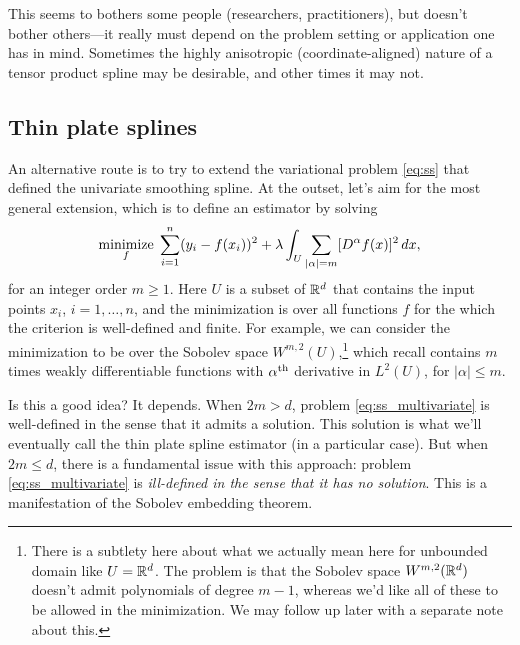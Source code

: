 \documentclass{article}
\begin{document}
This seems to bothers some people (researchers, practitioners), but doesn't
bother others---it really must depend on the problem setting or application one
has in mind. Sometimes the highly anisotropic (coordinate-aligned) nature of a
tensor product spline may be desirable, and other times it may not.    

\subsection{Thin plate splines}

An alternative route is to try to extend the variational problem \eqref{eq:ss}
that defined the univariate smoothing spline. At the outset, let's aim for the
most general extension, which is to define an estimator by solving
\begin{equation}
\label{eq:ss_multivariate}
\mathop{\mathrm{minimize}}_f \; \sum_{i=1}^n (y_i - f(x_i))^2 + \lambda \int_U \sum_{|\alpha| =
  m} [D^\alpha f(x)]^2 \, dx,   
\end{equation}
for an integer order $m \geq 1$. Here $U$ is a subset of $\mathbb{R}^d$ that contains
the input points $x_i$, $i=1,\dots,n$, and the minimization is over all
functions $f$ for the which the criterion is well-defined and finite. For
example, we can consider the minimization to be over the Sobolev space
$W^{m,2}(U)$,\footnote{There is a subtlety here about what we actually mean here
  for unbounded domain like $U = \mathbb{R}^d$. The problem is that the Sobolev space 
  $W^{m,2}(\mathbb{R}^d)$ doesn't admit polynomials of degree $m-1$, whereas we'd like
  all of these to be allowed in the minimization. We may follow up later with a
  separate note about this.}   
which recall contains $m$ times weakly differentiable functions with $\alpha^{\text{th}}$
derivative in $L^2(U)$, for $|\alpha| \leq m$. 


Is this a good idea? It depends. When $2m > d$, problem
\eqref{eq:ss_multivariate} is well-defined in the sense that it admits a
solution. This solution is what we'll eventually call the thin plate spline
estimator (in a particular case). But when $2m \leq d$, there is a fundamental
issue with this approach: problem \eqref{eq:ss_multivariate} is
\emph{ill-defined in the sense that it has no solution}. This is a manifestation
of the Sobolev embedding theorem.
\end{document}
